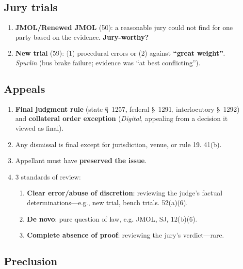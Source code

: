 \subsection{Jury trials}

\begin{enumerate}
    \item \textbf{JMOL/Renewed JMOL} (50): a reasonable jury could not find 
    for one party based on the evidence. \textbf{Jury-worthy?}
    \item \textbf{New trial} (59): (1) procedural errors or (2) against 
    \textbf{``great weight''}. \emph{Spurlin} (bus brake failure; evidence was 
    ``at best conflicting'').
\end{enumerate}

\subsection{Appeals}

\begin{enumerate}
    \item \textbf{Final judgment rule} (state \S\ 1257, federal \S\ 1291, 
    interlocutory \S\ 1292) and \textbf{collateral order exception} 
    (\emph{Digital}, appealing from a decision it viewed as final).
    \item Any dismissal is final except for jurisdiction, venue, or rule 19.  
    41(b).
    \item Appellant must have \textbf{preserved the issue}.
    \item 3 standards of review:
    \begin{enumerate}
        \item \textbf{Clear error/abuse of discretion}: reviewing the judge's 
        factual determinations---e.g., new trial, bench trials. 52(a)(6).
        \item \textbf{De novo}: pure question of law, e.g. JMOL, SJ, 12(b)(6).
        \item \textbf{Complete absence of proof}: reviewing the jury's 
        verdict---rare.
    \end{enumerate}
\end{enumerate}

\subsection{Preclusion}

